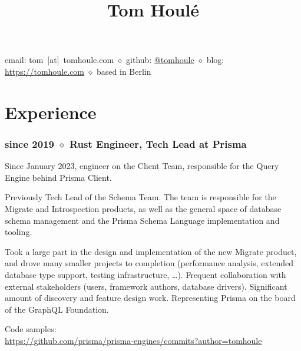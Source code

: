 \documentclass[10pt]{article}
\date{}
\title{Tom Houlé}
\author{}
\newcommand{\setparskip}{\setlength{\parskip}{.3em}}
\begin{document}
\maketitle

\vspace{-16mm}

\begin{center}
email: tom~[at]~tomhoule.com $\diamond$ github: \href{https://github.com/tomhoule}{@tomhoule} $\diamond$ blog: \url{https://tomhoule.com} $\diamond$ based in Berlin
\end{center}

\vspace{10mm}

\begin{minipage}[t]{0.54\textwidth}
  \setparskip

  \section*{Experience}

  \subsubsection*{since 2019 $\diamond$ Rust Engineer, Tech Lead at Prisma}

    \vspace{-0.8em}

    Since January 2023, engineer on the Client Team, responsible for the Query
    Engine behind Prisma Client.

    Previously Tech Lead of the Schema Team. The team is responsible for the Migrate
    and Introspection products, as well as the general space of database schema
    management and the Prisma Schema Language implementation and tooling.

    Took a large part in the design and implementation of the new Migrate
    product, and drove many smaller projects to completion (performance
    analysis, extended database type support, testing infrastructure, …).
    Frequent collaboration with external stakeholders (users, framework
    authors, database drivers). Significant amount of discovery and feature
    design work. Representing Prisma on the board of the GraphQL Foundation.

    Code samples: \\
    \url{https://github.com/prisma/prisma-engines/commits?author=tomhoule}

    \vspace{-0.5em}


\end{minipage}
\end{document}
